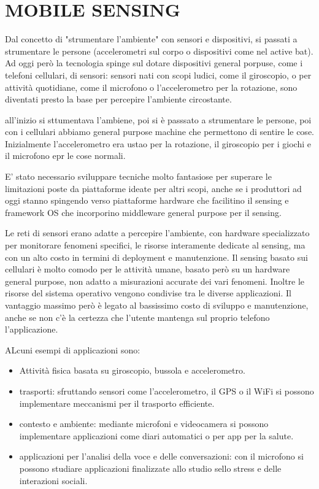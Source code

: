 \documentclass{article}
\begin{document}
\section{MOBILE SENSING}
Dal concetto di "strumentare l'ambiente" con sensori e dispositivi, si passati a strumentare le persone (accelerometri sul corpo o dispositivi come nel active bat). Ad oggi però la tecnologia spinge sul dotare dispositivi general porpuse, come i telefoni cellulari, di sensori: sensori nati con scopi ludici, come il giroscopio, o per attività quotidiane, come il microfono o l'accelerometro per la rotazione, sono diventati presto la base per percepire l'ambiente circostante.

all'inizio si sttumentava l'ambiene, poi si è passsato a strumentare le persone, poi con i cellulari abbiamo general purpose machine che permettono di sentire le cose. Inizialmente l'accelerometro era ustao per la rotazione, il giroscopio per i giochi e il microfono epr le cose normali.

E' stato necessario sviluppare tecniche molto fantasiose per superare le limitazioni poste da piattaforme ideate per altri scopi, anche se i produttori ad oggi stanno spingendo verso piattaforme hardware che facilitino il sensing e framework OS che incorporino middleware general purpose per il sensing.

Le reti di sensori erano adatte a percepire l'ambiente, con hardware specializzato per monitorare fenomeni specifici, le risorse interamente dedicate al sensing, ma con un alto costo in termini di deployment e manutenzione.
Il sensing basato sui cellulari è molto comodo per le attività umane, basato però su un hardware general purpose, non adatto a misurazioni accurate dei vari fenomeni. Inoltre le risorse del sistema operativo vengono condivise tra le diverse applicazioni. Il vantaggio massimo però è legato al bassissimo costo di sviluppo e manutenzione, anche se non c'è la certezza che l'utente mantenga sul proprio telefono l'applicazione.

ALcuni esempi di applicazioni sono:
\begin{itemize}
\item Attività fisica basata su giroscopio, bussola e accelerometro.
\item trasporti: sfruttando sensori come l'accelerometro, il GPS o il WiFi si possono implementare meccanismi per il trasporto efficiente.
\item contesto e ambiente: mediante microfoni e videocamera si possono implementare applicazioni come diari automatici o per app per la salute.
\item applicazioni per l'analisi della voce e delle conversazioni: con il microfono si possono studiare applicazioni finalizzate allo studio sello stress e delle interazioni sociali.
\end{itemize}
\end{document}

